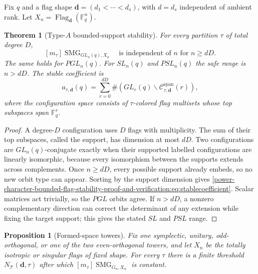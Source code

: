 \documentclass[10pt]{article}
\newcommand{\SMG}{\operatorname{SMG}}
\newcommand{\MGF}{\SMG}
\newcommand{\F}{\mathbb F}
\newtheorem{theorem}{Theorem}
\newtheorem{proposition}{Proposition}
\begin{document}
Fix $q$ and a flag shape
$\mathbf d=(d_1<\cdots<d_s)$, with $d=d_s$ independent of ambient rank.  Let
$X_n=\operatorname{Flag}_{\mathbf d}(\F_q^n)$.

\begin{theorem}[Type-$A$ bounded-support stability]\label{power-character-bounded-flag-stability-proof-and-verification:thm:typeA}
For every partition $\tau$ of total degree $D$,
\begin{equation}\label{power-character-bounded-flag-stability-proof-and-verification:eq:typeAstable}
[m_\tau]\MGF_{GL_n(q),X_n}\quad\text{is independent of $n$ for }n\ge dD.
\end{equation}
The same holds for $PGL_n(q)$.  For $SL_n(q)$ and $PSL_n(q)$ the safe range is
$n>dD$.  The stable coefficient is
\begin{equation}\label{power-character-bounded-flag-stability-proof-and-verification:eq:stablecoefficient}
a_{\tau,\mathbf d}(q)=\sum_{r=0}^{dD}\#\left(
GL_r(q)\backslash\mathcal C_{\tau,\mathbf d}^{\mathrm{span}}(r)\right),
\end{equation}
where the configuration space consists of $\tau$-colored flag multisets whose
top subspaces span $\F_q^r$.
\end{theorem}

\begin{proof}
A degree-$D$ configuration uses $D$ flags with multiplicity.  The sum of their
top subspaces, called the support, has dimension at most $dD$.  Two
configurations are $GL_n(q)$-conjugate exactly when their supported labelled
configurations are linearly isomorphic, because every isomorphism between the
supports extends across complements.  Once $n\ge dD$, every possible support
already embeds, so no new orbit type can appear.  Sorting by the support
dimension gives \eqref{power-character-bounded-flag-stability-proof-and-verification:eq:stablecoefficient}.  Scalar matrices act trivially,
so the $PGL$ orbits agree.  If $n>dD$, a nonzero complementary direction can
correct the determinant of any extension while fixing the target support;
this gives the stated $SL$ and $PSL$ range.
\end{proof}

\begin{proposition}[Formed-space towers]\label{power-character-bounded-flag-stability-proof-and-verification:prop:formed}
Fix one symplectic, unitary, odd-orthogonal, or one of the two
even-orthogonal towers, and let $X_n$ be the totally isotropic or singular
flags of fixed shape.  For every $\tau$ there is a finite threshold
$N_{\mathcal T}(\mathbf d,\tau)$ after which
$[m_\tau]\MGF_{G_n,X_n}$ is constant.
\end{proposition}
\end{document}
